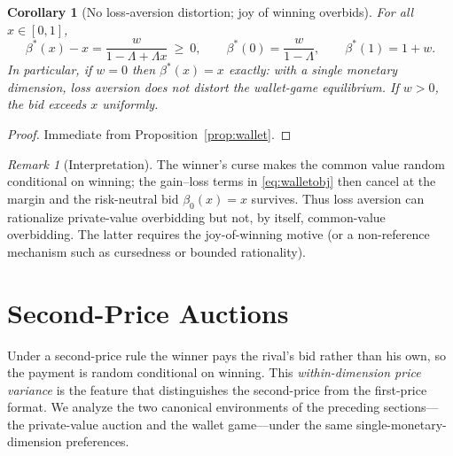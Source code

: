 \documentclass[11pt,a4paper]{article}
\newtheorem{corollary}{Corollary}
\theoremstyle{remark}
\newtheorem{remark}{Remark}
\begin{document}
\begin{corollary}[No loss-aversion distortion; joy of winning overbids]
\label{cor:wallet}
For all $x\in[0,1]$,
\begin{equation}
\beta^{*}(x)-x=\frac{w}{1-\Lambda+\Lambda x}\ \ge\ 0 ,
\qquad
\beta^{*}(0)=\frac{w}{1-\Lambda},\qquad \beta^{*}(1)=1+w .
\end{equation}
In particular, if $w=0$ then $\beta^{*}(x)=x$ exactly: with a single monetary
dimension, loss aversion does \emph{not} distort the wallet-game equilibrium. If
$w>0$, the bid exceeds $x$ uniformly.
\end{corollary}
\begin{proof}
Immediate from Proposition~\ref{prop:wallet}.
\end{proof}
\begin{remark}[Interpretation]
The winner's curse makes the common value random conditional on winning; the
gain--loss terms in \eqref{eq:walletobj} then cancel at the margin and the
risk-neutral bid $\beta_0(x)=x$ survives. Thus loss aversion can rationalize
private-value overbidding but not, by itself, common-value overbidding. The latter
requires the joy-of-winning motive (or a non-reference mechanism such as cursedness
or bounded rationality).
\end{remark}
\section{Second-Price Auctions}
\label{sec:spa}
Under a second-price rule the winner pays the rival's bid rather than his own, so the
payment is random conditional on winning. This \emph{within-dimension price variance}
is the feature that distinguishes the second-price from the first-price format. We
analyze the two canonical environments of the preceding sections---the private-value
auction and the wallet game---under the same single-monetary-dimension preferences.
\end{document}
